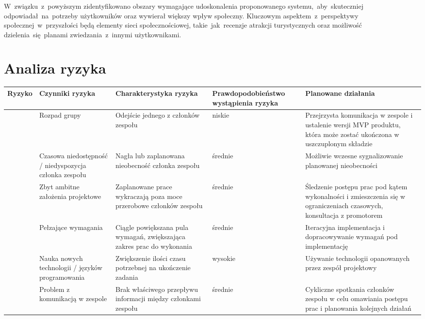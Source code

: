 \indent W~związku~z~powyższym zidentyfikowano obszary wymagające udoskonalenia proponowanego systemu,~aby~skuteczniej odpowiadał~na~potrzeby użytkowników oraz wywierał większy wpływ społeczny.
Kluczowym aspektem~z~perspektywy społecznej~w~przyszłości będą elementy sieci społecznościowej, takie~jak~recenzje atrakcji turystycznych oraz możliwość dzielenia~się~planami zwiedzania~z~innymi użytkownikami.



\pagebreak
\section{Analiza ryzyka}
\label{sec:analiza-ryzyka}

\begin{longtable}{|p{.1\linewidth}|p{}|p{}|p{}|p{}|}
    \hline
    Ryzyko & Czynniki ryzyka & Charakterystyka ryzyka & Prawdopodobieństwo wystąpienia ryzyka & Planowane działania \\
    \hline
    \multirow{6}{=}{\parbox[c]{12cm}{}}& Rozpad grupy & Odejście jednego z członków zespołu & niskie
    & Przejrzysta komunikacja w zespole i ustalenie wersji MVP produktu, która może zostać ukończona w uszczuplonym składzie \\
    \cline{2-5}
    & Czasowa niedostępność / niedyspozycja członka zespołu & Nagła lub zaplanowana nieobecność członka zespołu & średnie
    & Możliwie wczesne sygnalizowanie planowanej nieobecności \\
    \cline{2-5}
    & Zbyt ambitne założenia projektowe & Zaplanowane prace wykraczają poza moce przerobowe członków zespołu & średnie
    & Śledzenie postępu prac pod kątem wykonalności i zmieszczenia się w ograniczeniach czasowych, konsultacja z promotorem \\
    \cline{2-5}
    & Pełzające wymagania & Ciągle powiększana pula wymagań, zwiększająca zakres prac do wykonania & średnie & Iteracyjna implementacja i dopracowywanie wymagań pod implementację \\
    \cline{2-5}
    & Nauka nowych technologii / języków programowania & Zwiększenie ilości czasu potrzebnej na ukończenie zadania &
    wysokie & Używanie technologii opanowanych przez zespół projektowy \\
    \cline{2-5}
    & Problem z komunikacją w zespole & Brak właściwego przepływu informacji między członkami zespołu & średnie
    & Cykliczne spotkania członków zespołu w celu omawiania postępu prac i planowania kolejnych działań \\

\end{longtable}
